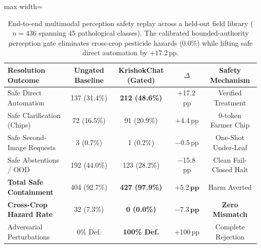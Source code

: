 \begin{table}[t]
\centering
\caption{End-to-end multimodal perception safety replay across a held-out field library ($n=436$ spanning 45 pathological classes). The calibrated bounded-authority perception gate eliminates cross-crop pesticide hazards ($0.0\%$) while lifting safe direct automation by $+17.2$\,pp.}
\label{tab:multimodal_safety_replay}
\scriptsize
\setlength{\tabcolsep}{3.2pt}
\renewcommand{\arraystretch}{1.1}
\begin{adjustbox}{max width=\columnwidth}
\begin{tabular}{lcccc}
\toprule
\textbf{Resolution Outcome} & \textbf{Ungated Baseline} & \textbf{KrishokChat (Gated)} & \textbf{$\Delta$} & \textbf{Safety Mechanism} \\
\midrule
Safe Direct Automation & 137 (31.4\%) & \textbf{212 (48.6\%)} & $+$17.2\,pp & Verified Treatment \\
Safe Clarification (Chips) & 72 (16.5\%) & 91 (20.9\%) & $+$4.4\,pp & 0-token Farmer Chip \\
Safe Second-Image Requests & 3 (0.7\%) & 1 (0.2\%) & $-$0.5\,pp & One-Shot Under-Leaf \\
Safe Abstentions / OOD & 192 (44.0\%) & 123 (28.2\%) & $-$15.8\,pp & Clean Fail-Closed Halt \\
\midrule
\textbf{Total Safe Containment} & 404 (92.7\%) & \textbf{427 (97.9\%)} & $\mathbf{+5.2\,\textbf{pp}}$ & Harm Averted \\
\textbf{Cross-Crop Hazard Rate} & 32 (7.3\%) & \textbf{0 (0.0\%)} & $\mathbf{-7.3\,\textbf{pp}}$ & \textbf{Zero Mismatch} \\
Adversarial Perturbations & 0\% Def. & \textbf{100\% Def.} & $+$100\,pp & Complete Rejection \\
\bottomrule
\end{tabular}
\end{adjustbox}
\end{table}
